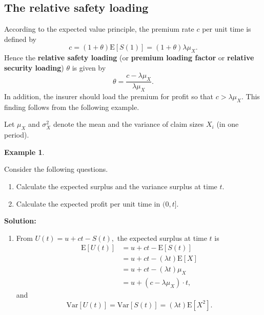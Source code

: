 \documentclass[landscape, 20pt]{extreport}
\providecommand{\tightlist}{%
  \setlength{\itemsep}{0pt}\setlength{\parskip}{0pt}}
\theoremstyle{definition}
\theoremstyle{definition}
\newtheorem{example}{Example}[chapter]
\theoremstyle{definition}
\theoremstyle{definition}
\theoremstyle{remark}
\begin{document}
\hypertarget{the-relative-safety-loading}{%
\subsection{The relative safety loading}\label{the-relative-safety-loading}}

According to the expected value principle, the premium rate \(c\) per
unit time is defined by
\[c = (1 + \theta) \mathrm{E}[S(1)] = (1 + \theta) \lambda \mu_X.\]
Hence the \textbf{relative safety loading} (or \textbf{premium loading factor} or
\textbf{relative security loading}) \(\theta\) is given by
\[\theta = \frac{c - \lambda \mu_X}{\lambda \mu_X}.\]
In addition, the insurer should load the premium for profit so that \(c > \lambda \mu_X\). This finding follows from the following example.

Let \(\mu_X\) and \(\sigma^2_X\) denote the mean and the variance of claim sizes \(X_i\) (in one period).

\newpage \begin{example}
\protect\hypertarget{exm:unlabeled-div-57}{}\label{exm:unlabeled-div-57}

Consider the following questions.

\begin{enumerate}
\def\labelenumi{\arabic{enumi}.}
\item
  Calculate the expected surplus and the variance surplus at time \(t\).
\item
  Calculate the expected profit per unit time in \((0, t]\).
\end{enumerate}

\end{example}

\textbf{Solution:}

\begin{enumerate}
\def\labelenumi{\arabic{enumi}.}
\tightlist
\item
  From \(U(t) = u + ct - S(t),\) the expected surplus at time \(t\) is
  \begin{align}
  \mathrm{E}[U(t)] &= u + ct - \mathrm{E}[S(t)] \\
  &= u + ct - (\lambda t)\mathrm{E}[X] \\
  &= u + ct - (\lambda t)\mu_X \\
  &= u + (c - \lambda \mu_X)\cdot t,
  \end{align}
  and \[ \mathrm{Var}[U(t)] = \mathrm{Var}[S(t)] = (\lambda t)\mathrm{E}[X^2].\]
\end{enumerate}
\end{document}
